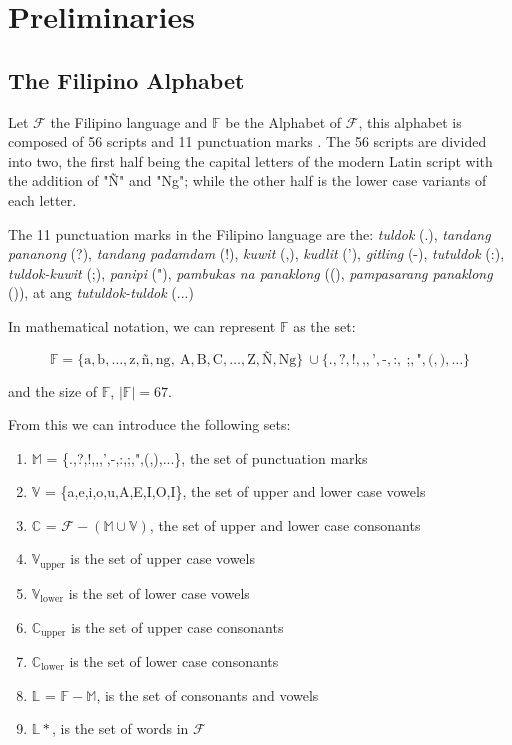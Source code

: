 \section{Preliminaries}
\subsection{The Filipino Alphabet}

Let \(\mathcal{F}\) the Filipino language
and \(\mathbb{F}\) be the Alphabet of \(\mathcal{F}\), this alphabet is
composed of 56 scripts and 11 punctuation marks \cite{OOP}. The 56 scripts are divided into
two, the first half being the capital letters of the modern Latin script with
the addition of "Ñ" and "Ng"; while the other half is the lower case variants
of each letter.

The 11 punctuation marks in the Filipino language are the: \textit{tuldok} (.),
\textit{tandang pananong} (?), \textit{tandang padamdam} (!), \textit{kuwit} (,),
\textit{kudlit} ('), \textit{gitling} (-), \textit{tutuldok} (:),
\textit{tuldok-kuwit} (;), \textit{panipi} ("), \textit{pambukas na panaklong}
((), \textit{pampasarang panaklong} ()), at ang \textit{tutuldok-tuldok} (...)

In mathematical notation, we can represent \(\mathbb{F}\) as the set:

\[
      \mathbb{F} = \{\text{a},\text{b},\dots,\text{z},\text{ñ},\text{ng},   \
      \text{A},\text{B},\text{C},\dots,\text{Z},\text{Ñ},\text{Ng}\}         \
      \cup \{\text{.},\text{?},\text{!},\text{,},\text{'},\text{-},\text{:}, \
      \text{;},\text{"},\text{(},\text{)}, \ldots\}
\]

and the size of \(\mathbb{F}\), \(\left|\mathbb{F}\right| = 67\).

From this we can introduce the following sets:
\begin{enumerate}
      \item \(\mathbb{M}\) = \{.,?,!,,,',-,:,;,",(,),...\}, the set of punctuation marks
      \item \(\mathbb{V}\) = \{a,e,i,o,u,A,E,I,O,I\}, the set of upper and lower case vowels
      \item \(\mathbb{C}\) = \(\mathcal{F} - (\mathbb{M}\cup\mathbb{V})\),
            the set of upper and lower case consonants
      \item \(\mathbb{V}_\text{upper}\) is the set of upper case vowels
      \item \(\mathbb{V}_\text{lower}\) is the set of lower case vowels
      \item \(\mathbb{C}_\text{upper}\) is the set of upper case consonants
      \item \(\mathbb{C}_\text{lower}\) is the set of lower case consonants
      \item \(\mathbb{L}\) = \(\mathbb{F} - \mathbb{M}\), is the set of consonants and vowels
      \item \(\mathbb{L}*\), is the set of words in \(\mathcal{F}\)
\end{enumerate}

